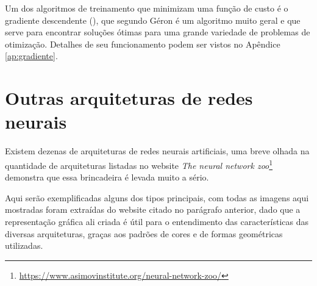 Um dos algoritmos de treinamento que minimizam uma função de custo é o gradiente descendente (), que segundo Géron \citep{hands} é um algoritmo muito geral e que serve para encontrar soluções ótimas para uma grande variedade de problemas de otimização. Detalhes de seu funcionamento podem ser vistos no Apêndice \ref{ap:gradiente}.

\section{Outras arquiteturas de redes neurais}

Existem dezenas de arquiteturas de redes neurais artificiais, uma breve olhada na quantidade de arquiteturas listadas no website \emph{The neural network zoo}\footnote{\url{https://www.asimovinstitute.org/neural-network-zoo/}} demonstra que essa brincadeira é levada muito a sério.

Aqui serão exemplificadas alguns dos tipos principais, com todas as imagens aqui mostradas foram extraídas do website citado no parágrafo anterior, dado que a representação gráfica ali criada é útil para o entendimento das características das diversas arquiteturas, graças aos padrões de cores e de formas geométricas utilizadas.